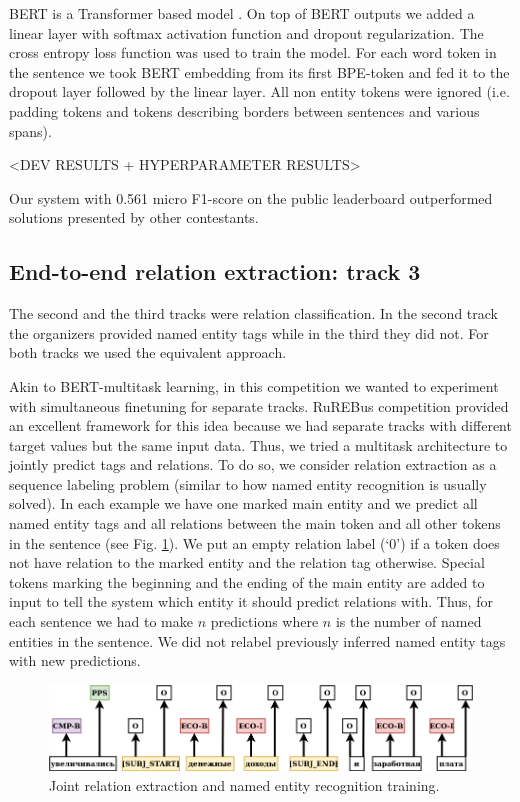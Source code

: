 \documentclass{dialogue}
\begin{document}
BERT is a Transformer based model \cite{attention}. On top of BERT outputs we added a linear layer with softmax activation function and dropout regularization. The cross entropy loss function was used to train the model. For each word token in the sentence we took BERT embedding from its first BPE-token and fed it to the dropout layer followed by the linear layer. All non entity tokens were ignored (i.e. padding tokens and tokens describing borders between sentences and various spans).

<DEV RESULTS + HYPERPARAMETER RESULTS>

Our system with 0.561 micro F1-score on the public leaderboard outperformed solutions presented by other contestants.

\subsection{End-to-end relation extraction: track 3}
The second and the third tracks were relation classification. In the second track the organizers provided named entity tags while in the third they did not. For both tracks we used the equivalent approach.

Akin to BERT-multitask learning, in this competition we wanted to experiment with simultaneous finetuning for separate tracks. RuREBus competition provided an excellent framework for this idea because we had separate tracks with different target values but the same input data. Thus, we tried a multitask architecture to jointly predict tags and relations. To do so, we consider relation extraction as a sequence labeling problem (similar to how named entity recognition is usually solved). In each example we have one marked main entity and we predict all named entity tags and all relations between the main token and all other tokens in the sentence (see Fig. \ref{fig:rel}). We put an empty relation label (‘0’) if a token does not have relation to the marked entity and the relation tag otherwise. Special tokens marking the beginning and the ending of the main entity are added to input to tell the system which entity it should predict relations with. Thus, for each sentence we had to make $n$ predictions where $n$ is the number of named entities in the sentence. We did not relabel previously inferred named entity tags with new predictions.


\begin{figure}[thb]
	\centering
	\includegraphics[scale=0.5]{pics/rel2}
	\caption{Joint relation extraction and named entity recognition training.}
	\label{fig:rel}
\end{figure}
\end{document}
